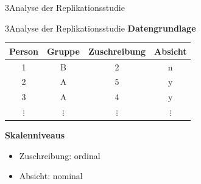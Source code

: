 \documentclass[xcolor=table,9pt,aspectratio=169]{beamer}
\begin{document}
\begin{frame}
\begin{overlayarea}{\textwidth}{0.81\paperheight}{
   \vspace*{11mm}
   \textcolor{uolblue}
   {3\hspace*{1em}Analyse der Replikationsstudie}
}
\end{overlayarea}
\end{frame}


\begin{frame}{\vspace*{10mm}3\hspace*{1em}Analyse der Replikationsstudie}
\textbf{Datengrundlage}\\
\smallskip
\begin{tabular}[h]{cccc}
   \arrayrulecolor{blue2}\hline
   Person     & Gruppe     & Zuschreibung   & Absicht    \\
   \hline
   1          & B          & 2              & n          \\
   2          & A          & 5              & y          \\
   3          & A          & 4              & y          \\
   $\vdots$   & $\vdots$   & $\vdots$       & $\vdots$   \\
   \hline
\end{tabular}

\bigskip
\textbf{Skalenniveaus}\\
\begin{itemize}
   \item Zuschreibung: ordinal
   \item Absicht: nominal
\end{itemize}

\end{frame}
\end{document}
